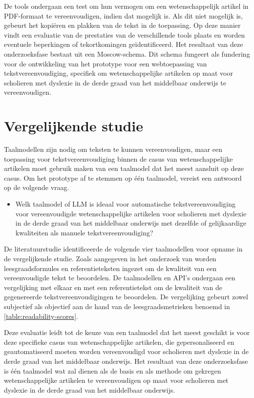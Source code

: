 De tools ondergaan een test om hun vermogen om een wetenschappelijk artikel in PDF-formaat te vereenvoudigen, indien dat mogelijk is. Als dit niet mogelijk is, gebeurt het kopiëren en plakken van de tekst in de toepassing. Op deze manier vindt een evaluatie van de prestaties van de verschillende tools plaats en worden eventuele beperkingen of tekortkomingen geïdentificeerd. Het resultaat van deze onderzoeksfase bestaat uit een Moscow-schema. Dit schema fungeert als fundering voor de ontwikkeling van het prototype voor een webtoepassing van tekstvereenvoudiging, specifiek om wetenschappelijke artikelen op maat voor scholieren met dyslexie in de derde graad van het middelbaar onderwijs te vereenvoudigen.

\section{Vergelijkende studie}
\label{sec:vergelijkende-studie}

Taalmodellen zijn nodig om teksten te kunnen vereenvoudigen, maar een toepassing voor tekstvereenvoudiging binnen de casus van wetenschappelijke artikelen moet gebruik maken van een taalmodel dat het meest aansluit op deze casus. Om het prototype af te stemmen op één taalmodel, vereist een antwoord op de volgende vraag. 

\begin{itemize}
	\item Welk taalmodel of LLM is ideaal voor automatische tekstvereenvoudiging voor vereenvoudigde wetenschappelijke artikelen voor scholieren met dyslexie in de derde graad van het middelbaar onderwijs met dezelfde of gelijkaardige kwaliteiten als manuele tekstvereenvoudiging?
\end{itemize}

De literatuurstudie identificeerde de volgende vier taalmodellen voor opname in de vergelijkende studie. Zoals aangegeven in het onderzoek van \textcite{Nenkova2004} worden leesgraadsformules en referentieteksten ingezet om de kwaliteit van een vereenvoudigde tekst te beoordelen. De taalmodellen en API's ondergaan een vergelijking met elkaar en met een referentietekst om de kwaliteit van de gegenereerde tekstvereenvoudigingen te beoordelen. De vergelijking gebeurt zowel subjectief als objectief aan de hand van de leesgraadsmetrieken benoemd in \ref{table:readability-scores}.

\medspace

Deze evaluatie leidt tot de keuze van een taalmodel dat het meest geschikt is voor deze specifieke casus van wetenschappelijke artikelen, die gepersonaliseerd en geautomatiseerd moeten worden vereenvoudigd voor scholieren met dyslexie in de derde graad van het middelbaar onderwijs. Het resultaat van deze onderzoeksfase is één taalmodel wat zal dienen als de basis en als methode om gekregen wetenschappelijke artikelen te vereenvoudigen op maat voor scholieren met dyslexie in de derde graad van het middelbaar onderwijs.

